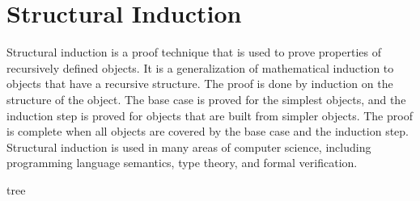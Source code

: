 \section{Structural Induction}
\label{sec:structural}
Structural induction is a proof technique that is used to prove properties of recursively defined objects.
It is a generalization of mathematical induction to objects that have a recursive structure.
The proof is done by induction on the structure of the object.
The base case is proved for the simplest objects, and the induction step is proved for objects that are built from simpler objects.
The proof is complete when all objects are covered by the base case and the induction step.
Structural induction is used in many areas of computer science, including programming language semantics, type theory, and formal verification.
\begin{example}
    tree
\end{example}